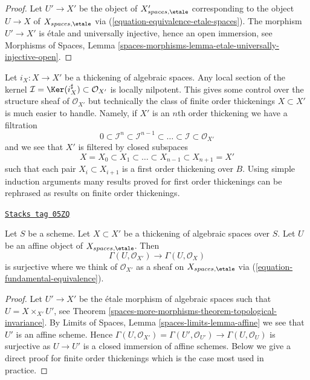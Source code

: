 \begin{proof}
Let $U' \to X'$ be the object of $X'_{spaces, \etale}$
corresponding to the object $U \to X$ of $X_{spaces, \etale}$
via (\ref{equation-equivalence-etale-spaces}). The morphism
$U' \to X'$ is \'etale and universally injective, hence an open immersion, see
Morphisms of Spaces,
Lemma \ref{spaces-morphisms-lemma-etale-universally-injective-open}.
\end{proof}

Let $i_X : X \to X'$ be a thickening of algebraic spaces. Any local section
of the kernel $\mathcal{I} = \Ker(i_X^\sharp) \subset \mathcal{O}_{X'}$ is
locally nilpotent. This gives some control over the structure sheaf
of $\mathcal{O}_{X'}$ but technically the class of finite order
thickenings $X \subset X'$ is much easier to handle.
Namely, if $X'$ is an $n$th order thickening we have a filtration
$$
0 \subset \mathcal{I}^n \subset \mathcal{I}^{n - 1} \subset
\ldots \subset \mathcal{I} \subset \mathcal{O}_{X'}
$$
and we see that $X'$ is filtered by closed subspaces
$$
X = X_0 \subset X_1 \subset \ldots \subset X_{n - 1} \subset X_{n + 1} = X'
$$
such that each pair $X_i \subset X_{i + 1}$ is a first order thickening
over $B$. Using simple induction arguments many results proved for first order
thickenings can be rephrased as results on finite order thickenings.

\begin{lemma}
\label{spaces-more-morphisms-lemma-first-order-thickening-surjective}
\href{https://stacks.math.columbia.edu/tag/05ZQ}{\texttt{Stacks tag 05ZQ}}

Let $S$ be a scheme. Let $X \subset X'$ be a thickening
of algebraic spaces over $S$. Let $U$ be an affine object of
$X_{spaces, \etale}$. Then
$$
\Gamma(U, \mathcal{O}_{X'}) \to \Gamma(U, \mathcal{O}_X)
$$
is surjective where we think of $\mathcal{O}_{X'}$ as a sheaf on
$X_{spaces, \etale}$ via (\ref{equation-fundamental-equivalence}).
\end{lemma}

\begin{proof}
Let $U' \to X'$ be the \'etale morphism of algebraic spaces such that
$U = X \times_{X'} U'$, see Theorem \ref{spaces-more-morphisms-theorem-topological-invariance}.
By Limits of Spaces, Lemma \ref{spaces-limits-lemma-affine} we see
that $U'$ is an affine scheme. Hence
$\Gamma(U, \mathcal{O}_{X'}) = \Gamma(U', \mathcal{O}_{U'}) \to
\Gamma(U, \mathcal{O}_U)$
is surjective as $U \to U'$ is a closed immersion of affine schemes.
Below we give a direct proof for finite order thickenings
which is the case most used in practice.
\end{proof}

